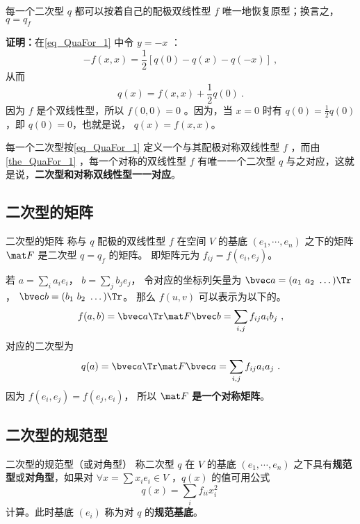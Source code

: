 \begin{theorem}{}\label{the_QuaFor_1}
每一个二次型 $q$ 都可以按着自己的配极双线性型 $f$ 唯一地恢复原型；换言之， $q=q_f$
\end{theorem}
\textbf{证明：}在\autoref{eq_QuaFor_1} 中令 $y=-x$ ：
\begin{equation}
-f(x,x)=\frac{1}{2}[q(0)-q(x)-q(-x)]~,
\end{equation}
从而
\begin{equation}
q(x)=f(x,x)+\frac{1}{2}q(0)~.
\end{equation}
因为 $f$ 是个双线性型，所以 $f(0,0)=0$ 。因为，当 $x=0$ 时有 $q(0)=\frac{1}{2}q(0)$ ，即 $q(0)=0$，也就是说， $q(x)=f(x,x)$。

每一个二次型按\autoref{eq_QuaFor_1} 定义一个与其配极对称双线性型 $f$ ，而由\autoref{the_QuaFor_1} ，每一个对称的双线性型 $f$ 有唯一一个二次型 $q$ 与之对应，这就是说，\textbf{二次型和对称双线性型一一对应}。

\subsection{二次型的矩阵}
\begin{definition}{二次型的矩阵}
称与 $q$ 配极的双线性型 $f$ 在空间 $V$ 的基底 $(e_1,\cdots,e_n)$ 之下的矩阵 $\mat F$ 是二次型 $q=q_f$ 的矩阵。 即矩阵元为 $f_{ij} = f(e_i, e_j)$。
\end{definition}

若 $a = \sum_i a_i e_i$， $b = \sum_j b_j e_j$， 令对应的坐标列矢量为 $\bvec a = (a_1\ a_2\ \dots)\Tr$， $\bvec b = (b_1\ b_2\ \dots)\Tr$。 那么 $f(u, v)$ 可以表示为以下的。
\begin{equation}
f(a, b) = \bvec a\Tr \mat F \bvec b = \sum_{i,j} f_{ij}a_i b_j~,
\end{equation}
对应的二次型为
\begin{equation}
q(a) = \bvec a\Tr \mat F \bvec a = \sum_{i,j} f_{ij}a_i a_j~.
\end{equation}
因为 $f(e_i, e_j) = f(e_j, e_i)$， 所以 $\mat F$ \textbf{是一个对称矩阵}。

\subsection{二次型的规范型}
\begin{definition}{二次型的规范型（或对角型）}\label{def_QuaFor_1}
称二次型 $q$ 在 $V$ 的基底 $(e_1,\cdots,e_n)$ 之下具有\textbf{规范型}或\textbf{对角型}，如果对 $\forall x=\sum x_i e_i\in V$ ，$q(x)$ 的值可用公式
\begin{equation}
q(x)=\sum_{i}f_{ii}x_i^2~
\end{equation}
计算。此时基底 $(e_i)$ 称为对 $q$ 的\textbf{规范基底}。
\end{definition}

